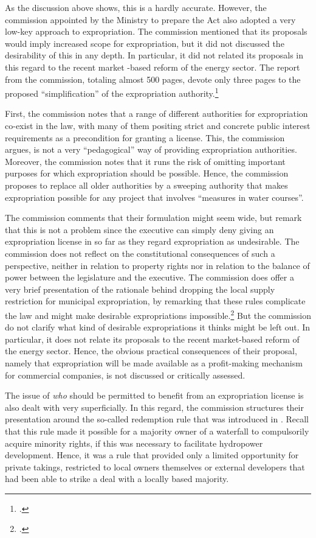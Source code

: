 As the discussion above shows, this is a hardly accurate. However, the commission appointed by the Ministry to prepare the Act also adopted a very low-key approach to expropriation. The commission mentioned that its proposals would imply increased scope for expropriation, but it did  not discussed the desirability of this in any depth. In particular, it did not related its proposals in this regard to the recent market -based reform of the energy sector.  The report from the commission, totaling almost 500 pages, devote only three pages to the proposed ``simplification'' of the expropriation authority.\footcite[235-237]{nou94}

First, the commission notes that a range of different authorities for expropriation co-exist in the law, with many of them positing strict and concrete public interest requirements as a precondition for granting a license. This, the commission argues, is not a very ``pedagogical'' way of providing expropriation authorities. Moreover, the commission notes that it runs the risk of omitting important purposes for which expropriation should be possible. Hence, the commission proposes to replace all older authorities by a sweeping authority that makes expropriation possible for any project that involves ``measures in water courses''.  

The commission comments that their formulation might seem wide, but remark that this is not a problem since the executive can simply deny giving an expropriation license in so far as they regard expropriation as undesirable. The commission does not reflect on the  constitutional consequences of such a perspective, neither in relation to property rights nor in relation to the balance of power between the legislature and the executive. The commission does offer a very brief presentation of the rationale behind dropping the local supply restriction for municipal expropriation, by remarking that these rules complicate the law and might make desirable expropriations impossible.\footcite[235]{nou94}  But the commission do not clarify what kind of desirable expropriations it thinks might be left out. In particular, it does not relate its proposals to the recent market-based reform of the energy sector. Hence, the obvious practical consequences of their proposal, namely that expropriation will be made available as a profit-making mechanism for commercial companies, is not discussed or critically assessed.

The issue of {\it who} should be permitted to benefit from an expropriation license is also dealt with very superficially. In this regard, the commission structures their presentation around the so-called redemption rule that was introduced in \cite{wra40}. Recall that this rule made it possible for a majority owner of a waterfall to compulsorily acquire minority rights, if this was necessary to facilitate hydropower development. Hence, it was a rule that provided only a limited opportunity for private takings, restricted to local owners themselves or external developers that had been able to strike a deal with a locally based majority. 

